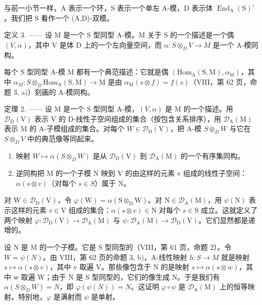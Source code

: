 与前一小节一样，A 表示一个环，S 表示一个单左 A-模，D 表示体 \(\operatorname{End}_{\mathrm{A}}(\mathrm{S})^{\circ}\)。我们把 S 看作一个 (A,D)-双模。

定义 3. —— 设 M 是一个 S 型同型 A-模。M 关于 S 的一个描述是一个偶 \((V, \alpha)\)，其中 V 是体 D 上的一个左向量空间，而 \(\alpha : S \otimes_{D} V \to M\) 是一个 A-模同构。

每个 S 型同型 A-模 M 都有一个典范描述：它就是偶 \((\mathrm{Hom}_{\mathrm{A}}(\mathrm{S},\mathrm{M}),\alpha_{\mathrm{M}})\)，其中 \(\alpha_{M}:S\otimes_{D}\mathrm{Hom}_{\mathrm{A}}(\mathrm{S},\mathrm{M})\to\mathrm{M}\) 是由 \(\alpha_{\mathrm{M}}(s\otimes f)=f(s)\)（VIII，第 62 页，命题 3, a)）刻画的 A-模同构。

定理 2. —— 设 M 是一个 S 型同型 A-模，\((V,\alpha)\) 是 M 的一个描述。用 \(\mathcal{D}_{\mathrm{D}}(\mathrm{V})\) 表示 V 的 D-线性子空间组成的集合（按包含关系排序），用 \(\mathcal{D}_{\mathrm{A}}(\mathrm{M})\) 表示 M 的 A-子模组成的集合。对每个 \(W \in \mathcal{D}_{\mathrm{D}}(\mathrm{V})\)，把 A-模 \(S \otimes_{D} W\) 与它在 \(S \otimes_{D} V\) 中的典范像等同起来。

\begin{enumerate}
\def\labelenumi{\alph{enumi})}
\item
  映射 \(W \mapsto \alpha(S \otimes_{D} W)\) 是从 \(\mathcal{D}_{\mathrm{D}}(\mathrm{V})\) 到 \(\mathcal{D}_{\mathrm{A}}(\mathrm{M})\) 的一个有序集同构。
\item
  逆同构把 M 的一个子模 N 映到 V 的由这样的元素 v 组成的线性子空间：\(\alpha(s \otimes v)\)（对每个 \(s \in S\)）属于 N。
\end{enumerate}

对 \(\mathrm{W} \in \mathcal{D}_{\mathrm{D}}(\mathrm{V})\)，令 \(\varphi(\mathrm{W}) = \alpha(\mathrm{S} \otimes_{\mathrm{D}} \mathrm{W})\)。对 \(\mathrm{N} \in \mathcal{D}_{\mathrm{A}}(\mathrm{M})\)，用 \(\psi(\mathrm{N})\) 表示这样的元素 \(v \in \mathrm{V}\) 组成的集合：\(\alpha(s \otimes v) \in \mathrm{N}\) 对每个 \(s \in \mathrm{S}\) 成立。这就定义了两个映射 \(\varphi: \mathcal{D}_{\mathrm{D}}(\mathrm{V}) \to \mathcal{D}_{\mathrm{A}}(\mathrm{M})\) 与 \(\psi: \mathcal{D}_{\mathrm{A}}(\mathrm{M}) \to \mathcal{D}_{\mathrm{D}}(\mathrm{V})\)。它们显然都是递增的。

设 N 是 M 的一个子模。它是 S 型同型的（VIII，第 61 页，命题 2）。令 \(W = \psi(N)\)。由 VIII，第 62 页的命题 3, b)，A-线性映射 \(h : S \to M\) 就是映射 \(s \mapsto \alpha(s \otimes v)\)，其中 v 取遍 V。那些像包含于 N 的是映射 \(s \mapsto \alpha(s \otimes w)\)，其中 w 取遍 W；由于 N 是 S 型同型的，它们的像生成 N。于是我们有 \(\alpha(S \otimes_{D} W) = N\)，即 \(\varphi(\psi(N)) = N\)。这证明 \(\varphi \circ \psi\) 是 \(\mathcal{D}_{\mathrm{A}}(\mathrm{M})\) 上的恒等映射。特别地，\(\varphi\) 是满射而 \(\psi\) 是单射。

